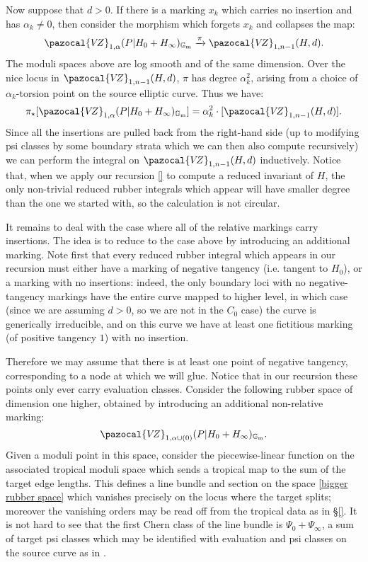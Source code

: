 \documentclass[11pt]{amsart}
\newcommand{\VZ}{\pazocal{V\!Z}}
\newcommand{\st}{\star}
\newcommand{\Gm}{\mathbb{G}_{\text{m}}}
\theoremstyle{definition}
\theoremstyle{definition}
\begin{document}
Now suppose that $d>0$. If there is a marking $x_k$ which carries no insertion and has $\alpha_k \neq 0$, then consider the morphism which forgets $x_k$ and collapses the map:
\begin{equation*} \VZ_{1,\alpha}(P|H_0+H_\infty)_{\Gm} \xrightarrow{\pi} \VZ_{1,n-1}(H,d). \end{equation*}
The moduli spaces above are log smooth and of the same dimension. Over the nice locus in $\VZ_{1,n-1}(H,d)$, $\pi$ has degree $\alpha_k^2$, arising from a choice of $\alpha_k$-torsion point on the source elliptic curve. Thus we have:
\begin{equation*} \pi_\st [\VZ_{1,\alpha}(P|H_0+H_\infty)_{\Gm}] = \alpha_k^2\cdot [\VZ_{1,n-1}(H,d)].\end{equation*}
Since all the insertions are pulled back from the right-hand side (up to modifying psi classes by some boundary strata which we can then also compute recursively) we can perform the integral on $\VZ_{1,n-1}(H,d)$ inductively. Notice that, when we apply our recursion \ref{} to compute a reduced invariant of $H$, the only non-trivial reduced rubber integrals which appear will have smaller degree than the one we started with, so the calculation is not circular.

It remains to deal with the case where all of the relative markings carry insertions. The idea is to reduce to the case above by introducing an additional marking. Note first that every reduced rubber integral which appears in our recursion must either have a marking of negative tangency (i.e. tangent to $H_0$), or a marking with no insertions: indeed, the only boundary loci with no negative-tangency markings have the entire curve mapped to higher level, in which case (since we are assuming $d>0$, so we are not in the $C_0$ case) the curve is generically irreducible, and on this curve we have at least one fictitious marking (of positive tangency $1$) with no insertion.

Therefore we may assume that there is at least one point of negative tangency, corresponding to a node at which we will glue. Notice that in our recursion these points only ever carry evaluation classes. Consider the following rubber space of dimension one higher, obtained by introducing an additional non-relative marking:
\begin{equation} \label{bigger rubber space}\VZ_{1,\alpha \cup (0)}(P|H_0+H_\infty)_{\Gm}. \end{equation}
Given a moduli point in this space, consider the piecewise-linear function on the associated tropical moduli space which sends a tropical map to the sum of the target edge lengths. This defines a line bundle and section on the space \eqref{bigger rubber space} which vanishes precisely on the locus where the target splits; moreover the vanishing orders may be read off from the tropical data as in \S \ref{}. It is not hard to see \cite{EKatz} that the first Chern class of the line bundle is
$\Psi_0 + \Psi_\infty$, a sum of target psi classes which may be identified with evaluation and psi classes on the source curve as in \cite[Construction 5.1.17]{GathmannThesis}. 
\end{document}
